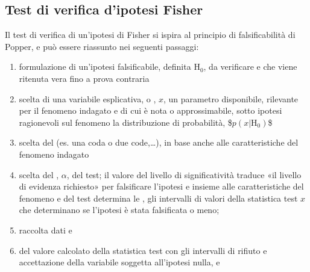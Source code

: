 \documentclass[letterpaper,10pt,italian]{jupyterBook}
\begin{document}
\subsection{Test di verifica d’ipotesi \sphinxhyphen{} Fisher}
\label{\detokenize{ch/statistics/test-fisher-coin-1:test-di-verifica-d-ipotesi-fisher}}\label{\detokenize{ch/statistics/test-fisher-coin-1::doc}}
\sphinxAtStartPar
Il test di verifica di un’ipotesi di Fisher si ispira al principio di falsificabilità di Popper, e può essere riassunto nei seguenti passaggi:
\begin{enumerate}
%
\item {} 
\sphinxAtStartPar
formulazione di un’ipotesi falsificabile, definita  \(\text{H}_0\), da verificare e che viene ritenuta vera fino a prova contraria

\item {} 
\sphinxAtStartPar
scelta di una variabile esplicativa, o , \(x\), un parametro disponibile, rilevante per il fenomeno indagato e di cui è nota \sphinxhyphen{} o approssimabile, sotto ipotesi ragionevoli sul fenomeno \sphinxhyphen{} la distribuzione di probabilità,
\$\(p(x|\text{H}_0)\)\$

\item {} 
\sphinxAtStartPar
scelta del  (es. una coda o due code,…), in base anche alle caratteristiche del fenomeno indagato

\item {} 
\sphinxAtStartPar
scelta del , \(\alpha\), del test; il valore del livello di significatività traduce «il livello di evidenza richiesto» per falsificare l’ipotesi e \sphinxhyphen{} insieme alle caratteristiche del fenomeno e del test \sphinxhyphen{} determina le , gli intervalli di valori della statistica test \(x\) che determinano se l’ipotesi è stata falsificata o meno;

\item {} 
\sphinxAtStartPar
raccolta dati e 

\item {} 
\sphinxAtStartPar
{} del valore calcolato della statistica test con gli intervalli di rifiuto e accettazione della variabile soggetta all’ipotesi nulla, e 

\end{enumerate}
\end{document}
